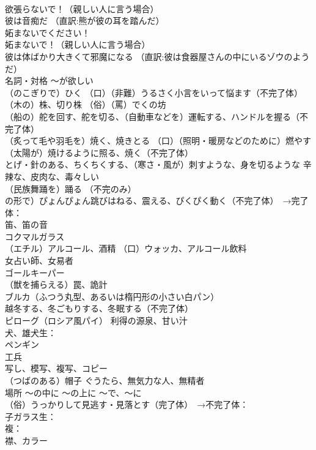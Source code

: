 \documentclass[8pt]{extreport}
\begin{document}
\begin{CJK}{UTF8}{min}
\\	欲張らないで！（親しい人に言う場合）
\\	彼は音痴だ （直訳:熊が彼の耳を踏んだ）
\\	妬まないでください！
\\	妬まないで！（親しい人に言う場合）
\\	彼は体ばかり大きくて邪魔になる （直訳:彼は食器屋さんの中にいるゾウのようだ）
\\	名詞・対格	〜が欲しい
\\	（のこぎりで）ひく （口）（非難）うるさく小言をいって悩ます（不完了体）
\\	（木の）株、切り株 （俗）（罵）でくの坊
\\	（船の）舵を回す、舵を切る、（自動車などを）運転する、ハンドルを握る（不完了体）
\\	（炙って毛や羽毛を）焼く、焼きとる （口）（照明・暖房などのために）燃やす （太陽が）焼けるように照る、焼く（不完了体）
\\	とげ・針のある、ちくちくする、（寒さ・風が）刺すような、身を切るような 辛辣な、皮肉な、毒々しい
\\	（民族舞踊を）踊る （不完のみ）
\\	の形で）ぴょんぴょん跳びはねる、震える、ぴくぴく動く（不完了体）　→完了体：
\\	笛、笛の音
\\	コクマルガラス
\\	（エチル）アルコール、酒精 （口）ウォッカ、アルコール飲料
\\	女占い師、女易者
\\	ゴールキーパー
\\	（獣を捕らえる）罠、詭計
\\	ブルカ（ふつう丸型、あるいは楕円形の小さい白パン）
\\	越冬する、冬ごもりする、冬眠する（不完了体）
\\	ピローグ（ロシア風パイ） 利得の源泉、甘い汁
\\	犬、雄犬生：
\\	ペンギン
\\	工兵
\\	写し、模写、複写、コピー
\\	（つばのある）帽子 ぐうたら、無気力な人、無精者
\\	場所	～の中に ～の上に ～で、～に
\\	（俗）うっかりして見逃す・見落とす（完了体）　→不完了体：
\\	子ガラス生：
\\	複：
\\	襟、カラー

\end{CJK}
\end{document}
